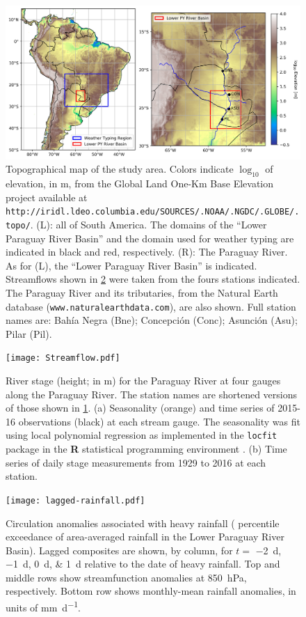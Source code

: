 \documentclass[twocol]{ametsoc}
\begin{document}
\begin{figure}
	\noindent\includegraphics[width=6.5in]{study-area.jpg}
	\caption{
		Topographical map of the study area.
		Colors indicate $\log_{10}$ of elevation, in \si{\meter}, from the Global Land One-Km Base Elevation project available at \texttt{http://iridl.ldeo.columbia.edu/SOURCES/.NOAA/.NGDC/.GLOBE/.topo/}.
		(L): all of South America.
		The domains of the ``Lower Paraguay River Basin'' and the domain used for weather typing are indicated in black and red, respectively.
		(R): The Paraguay River.
		As for (L), the ``Lower Paraguay River Basin'' is indicated.
		Streamflows shown in \cref{fig:streamflow} were taken from the fours stations indicated.
		The Paraguay River and its tributaries, from the Natural Earth database (\texttt{www.naturalearthdata.com}), are also shown.
		Full station names are: Bah\'ia Negra (Bne); Concepci\'on (Conc); Asunci\'on (Asu); Pilar (Pil).
	}
  \label{fig:study-area}
\end{figure}

\begin{figure}
	\noindent\texttt{[image: Streamflow.pdf]}
	\caption{
		River stage (height; in \si{\meter}) for the Paraguay River at four gauges along the Paraguay River.
		The station names are shortened versions of those shown in \cref{fig:study-area}.
		(a) Seasonality (orange) and time series of 2015-16 observations (black) at each stream gauge.
			The seasonality was fit using local polynomial regression as implemented in the \texttt{locfit} package in
			the \textbf{R} statistical programming environment \citep{Loader1999}.
		(b) Time series of daily stage measurements from 1929 to 2016 at each station.
	}
  \label{fig:streamflow}
\end{figure}

\begin{figure}	\noindent\texttt{[image: lagged-rainfall.pdf]}
	\caption{
		Circulation anomalies associated with heavy rainfall ( percentile exceedance of area-averaged rainfall in the Lower Paraguay River Basin).
		Lagged composites are shown, by column, for $t = $ \SIlist{-2;-1;0;1}{\day} relative to the date of heavy rainfall.
		Top and middle rows show streamfunction anomalies at \SIlist{850}{\hecto\pascal}, respectively.
		Bottom row shows monthly-mean rainfall anomalies, in units of \si{\milli\meter\per\day}.
	}
  \label{fig:lagged-rain}
\end{figure}
\end{document}
